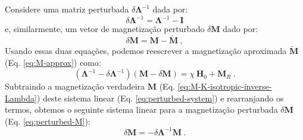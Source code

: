 Considere uma matriz perturbada $\delta \mathbf{\Lambda}^{-1}$ dada por:
\begin{equation}
\delta \mathbf{\Lambda}^{-1} = \mathbf{\Lambda}^{-1} - \mathbf{I}
\label{eq:perturbed-inverse-Lambda}
\end{equation}
e, similarmente, um vetor de magnetização perturbado $\delta \mathbf{M}$
dado por:
\begin{equation}
\delta \mathbf{M} = \mathbf{M} - \breve{\mathbf{M}} \: ,
\label{eq:perturbed-M}
\end{equation}
Usando essas duas equações, podemos reescrever a magnetização aproximada $\breve{\mathbf{M}}$ (Eq. \ref{eq:M-approx}) como:
\begin{equation}
\left( \mathbf{\Lambda}^{-1} - \delta \mathbf{\Lambda}^{-1} \right)
\left( \mathbf{M} - \delta \mathbf{M} \right) = 
\chi \, \mathbf{H}_{0} +
\mathbf{M}_{R} \: .
\label{eq:perturbed-system}
\end{equation}
Subtraindo a magnetização verdadeira 
$\mathbf{M}$ (Eq. \ref{eq:M-K-isotropic-inverse-Lambda})
deste sistema linear (Eq. \ref{eq:perturbed-system})
e rearranjando os termos, obtemos o seguinte sistema linear para a magnetização perturbada $\delta \mathbf{M}$
(Eq. \ref{eq:perturbed-M}):
\begin{equation}
\delta \mathbf{M} = - \delta \mathbf{\Lambda}^{-1} \mathbf{M} \: .
\label{eq:perturbed-M-system}
\end{equation}

